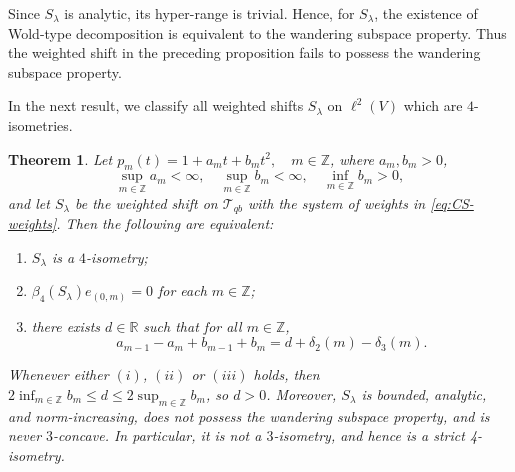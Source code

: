\documentclass[11pt, reqno, a4paper]{amsart}
\newtheorem{theorem}{Theorem}[section]
\theoremstyle{definition}
\newcommand{\scrT}{{\mathscr T}}
\renewcommand{\le}{\leqslant}
\newcommand{\R}{\mathbb R}
\newcommand{\Z}{\mathbb Z}
\numberwithin{equation}{section}
\begin{document}
    Since $S_{\lambda}$ is analytic, its hyper-range is trivial. Hence, for $S_{\lambda}$, the existence of Wold-type decomposition is equivalent to the wandering subspace property. Thus the weighted shift in the preceding proposition fails to possess the wandering subspace property.
    
    In the next result, we classify all weighted shifts $S_{\lambda}$ on $\ell ^2 ( V)$ which are $4$-isometries.
    
    \begin{theorem}
        \label{thm:classify-4-isometries}
        Let $p_m (t) =  1 + a_m t + b_m t^2, \quad m \in \Z$, where $a_m, b_m > 0$,
        \begin{equation}
            \sup_{m \in \Z} a_m < \infty, \quad \sup_{m \in \Z} b_m < \infty, \quad \inf_{m \in \Z} b_m > 0,
            \label{eqn:conditions-a-m-b-m}
        \end{equation}
        and let $S_\lambda$ be the weighted shift on $\scrT_{qb}$ with the system of weights in \eqref{eq:CS-weights}. Then the following are equivalent:
        \begin{enumerate}
            \item[(i)] $S_{\lambda}$ is a $4$-isometry;
            \item[(ii)] $\beta_4 (S_{\lambda}) e_{(0,m)} = 0$ for each $m \in \Z$;
            \item[(iii)] there exists $d \in \R$ such that for all $m \in \Z$,
            \begin{equation}
                \label{eq:4-isometry-characterisation}
                a_{m-1} - a_m + b_{m-1} + b_{m} = d + \delta_2 (m) - \delta_3 (m).
            \end{equation}
        \end{enumerate}
        Whenever either $(i)$, $(ii)$ or $(iii)$ holds, then $2 \inf_{m \in \Z} b_m \le d \le 2 \sup_{m \in \Z} b_m$, so $d > 0$. Moreover, $S_{\lambda}$ is bounded, analytic, and norm-increasing, does not possess the wandering subspace property, and is never $3$-concave. In particular, it is not a $3$-isometry, and hence is a strict 4-isometry.
    \end{theorem}
    
\end{document}
